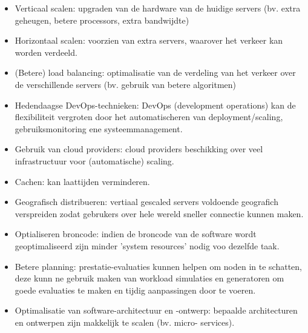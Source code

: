 \begin{itemize}
    \item Verticaal scalen: upgraden van de hardware van de huidige
    servers (bv. extra geheugen, betere processors, extra bandwijdte)
    \item Horizontaal scalen: voorzien van extra servers, waarover het
    verkeer kan worden verdeeld.
    \item (Betere) load balancing: optimalisatie van de verdeling van het
    verkeer over de verschillende servers (bv. gebruik van betere
    algoritmen)
    \item Hedendaagse DevOps-technieken: DevOps (development operations) kan
    de flexibiliteit vergroten door het automatischeren van deployment/scaling,
    gebruiksmonitoring ene systeemmanagement.
    \item Gebruik van cloud providers: cloud providers beschikking over
    veel infrastructuur voor (automatische) scaling.
    \item Cachen: kan laattijden verminderen.
    \item Geografisch distribueren: vertiaal gescaled servers voldoende
    geografich verspreiden zodat gebrukers over hele wereld sneller
    connectie kunnen maken.
    \item Optialiseren broncode: indien de broncode van de software wordt
    geoptimaliseerd zijn minder 'system resources' nodig voo dezelfde
    taak.
    \item Betere planning: prestatie-evaluaties kunnen helpen om noden in
    te schatten, deze kunn ne gebruik maken van workload simulaties en
    generatoren om goede evaluaties te maken en tijdig aanpassingen door
    te voeren.
    \item Optimalisatie van software-architectuur en -ontwerp:
    bepaalde architecturen en ontwerpen zijn makkelijk te scalen (bv. micro-
    services).
\end{itemize}
